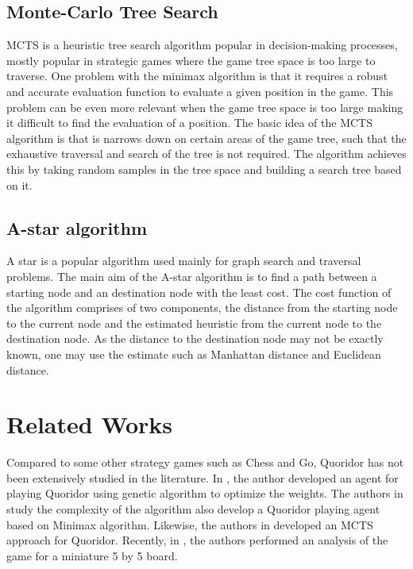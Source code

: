 \subsection{Monte-Carlo Tree Search}
\gls{MCTS} \citep{Coulom2006Efficient} is a heuristic tree search algorithm popular in decision-making processes, mostly popular in strategic games where the game tree space is too large to traverse. One problem with the minimax algorithm is that it requires a robust and accurate evaluation function to evaluate a given position in the game. This problem can be even more relevant when the game tree space is too large making it difficult to find the evaluation of a position. The basic idea of the \gls{MCTS} algorithm is that is narrows down on certain areas of the game tree, such that the exhaustive traversal and search of the tree is not required. The algorithm achieves this by taking random samples in the tree space and building a search tree based on it.

\subsection{A-star algorithm}
A star is a popular algorithm \citep{Hart1968AFormal} used mainly for graph search and traversal problems. The main aim of the A-star algorithm is to find a path between a starting node and an destination node with the least cost. The cost function of the algorithm comprises of two components, the distance from the starting node to the current node and the estimated heuristic from the current node to the destination node. As the distance to the destination node may not be exactly known, one may use the estimate such as Manhattan distance and Euclidean distance.


\section {Related Works}

Compared to some other strategy games such as Chess and Go, Quoridor has not been extensively studied in the literature. In \citep{Glendenning2002MasteringQ}, the author developed an agent for playing Quoridor using genetic algorithm to optimize the weights. The authors in \citep{Mertens2006Quoridor} study the complexity of the algorithm also develop a Quoridor playing agent based on Minimax algorithm. Likewise, the authors in \citep{Brenner2015Artificial} developed an \gls{MCTS} approach for Quoridor. Recently, in \citep{Iwanaga2022Analysis}, the authors performed an analysis of the game for a miniature 5 by 5 board.

